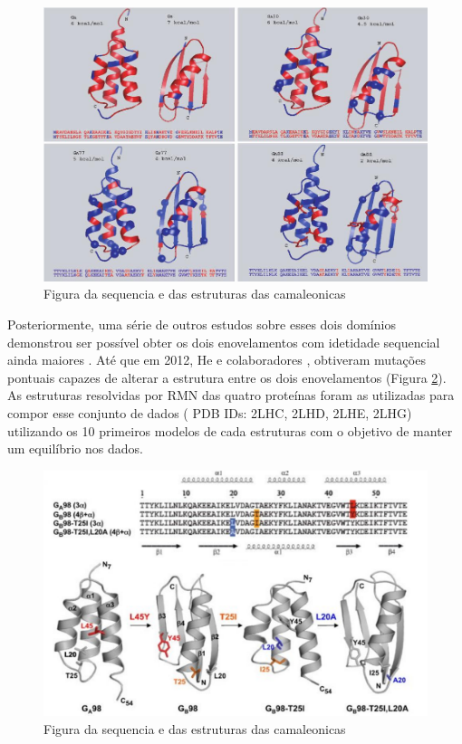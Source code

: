 \begin{figure}
  \centering
  \includegraphics[width=1.0\textwidth]{figures/ga_gb.jpg}
  \caption{Figura da sequencia e das estruturas das camaleonicas}
        \label{fig:ga_gb}
\end{figure}

Posteriormente, uma série de outros estudos sobre esses dois domínios demonstrou ser possível obter os dois enovelamentos com idetidade sequencial ainda maiores \cite{10.1073/pnas.0805857105, 10.1073/pnas.0906408106}.  Até que em 2012, He e colaboradores \cite{10.1016/j.str.2011.11.018}, obtiveram mutações pontuais capazes de alterar a estrutura entre os dois enovelamentos (Figura \ref{fig:camaleonicas}). As estruturas resolvidas por RMN das quatro proteínas foram as utilizadas para compor esse conjunto de dados ( PDB IDs: 2LHC, 2LHD, 2LHE, 2LHG) utilizando os 10 primeiros modelos de cada estruturas com o objetivo de manter um equilíbrio nos dados.

\begin{figure}
	\centering
	\includegraphics[width=1.0\textwidth]{figures/chameleonic_resume.pdf}
	\caption{Figura da sequencia e das estruturas das camaleonicas}
        \label{fig:camaleonicas}
\end{figure}

